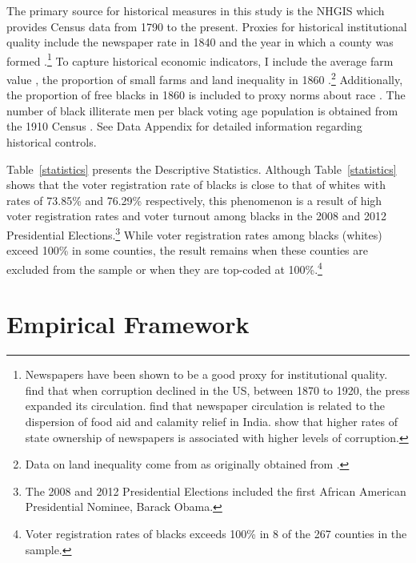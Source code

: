 \documentclass[AEJ, finalmode]{AEA}
\begin{document}
The primary source for historical measures in this study is the NHGIS \cite{ipumsnhgis} which provides Census data from 1790 to the present. Proxies for historical institutional quality include the newspaper rate in 1840 and the year in which a county was formed \cite{grosjean2014history}.\footnote{Newspapers have been shown to be a good proxy for institutional quality.  find that when corruption declined in the US, between 1870 to 1920, the press expanded its circulation.  find that newspaper circulation is related to the dispersion of food aid and calamity relief in India.  show that higher rates of state ownership of newspapers is associated with higher levels of corruption.} To capture historical economic indicators, I include the average farm value \cite{ipumsnhgis}, the proportion of small farms and land inequality in 1860 \cite{acharya2016political}.\footnote{Data on land inequality come from  as originally obtained from .} Additionally, the proportion of free blacks in 1860 is included to proxy norms about race \cite{acharya2016political}. The number of black illiterate men per black voting age population is obtained from the 1910 Census \cite{ipumsnhgis}. See Data Appendix for detailed information regarding historical controls. 

Table~\ref{statistics} presents the Descriptive Statistics. Although Table~\ref{statistics} shows that the voter registration rate of blacks is close to that of whites with rates of 73.85\% and 76.29\% respectively, this phenomenon is a result of high voter registration rates and voter turnout among blacks in the 2008 and 2012 Presidential Elections.\footnote{The 2008 and 2012 Presidential Elections included the first African American Presidential Nominee, Barack Obama.} While voter registration rates among blacks (whites) exceed 100\% in some counties, the result remains when these counties are excluded from the sample or when they are top-coded at 100\%.\footnote{Voter registration rates of blacks exceeds 100\% in 8 of the 267 counties in the sample.} 

\section{Empirical Framework}
\end{document}

